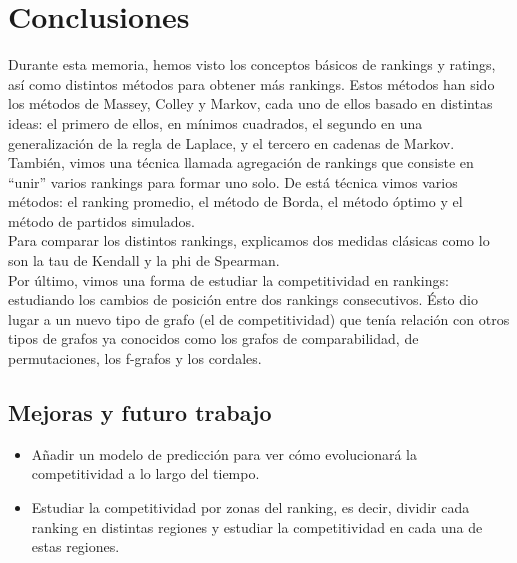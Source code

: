 \chapter{Conclusiones}

Durante esta memoria, hemos visto los conceptos básicos de rankings y ratings, así como distintos métodos para obtener más rankings. Estos métodos han sido los métodos de Massey, Colley y Markov, cada uno de ellos basado en distintas ideas: el primero de ellos, en mínimos cuadrados, el segundo en una generalización de la regla de Laplace, y el tercero en cadenas de Markov.\\

También, vimos una técnica llamada agregación de rankings que consiste en ``unir'' varios rankings para formar uno solo. De está técnica vimos varios métodos: el ranking promedio, el método de Borda, el método óptimo y el método de partidos simulados.\\

Para comparar los distintos rankings, explicamos dos medidas clásicas como lo son la tau de Kendall y la phi de Spearman.\\

Por último, vimos una forma de estudiar la competitividad en rankings: estudiando los cambios de posición entre dos rankings consecutivos. Ésto dio lugar a un nuevo tipo de grafo (el de competitividad) que tenía relación con otros tipos de grafos ya conocidos como los grafos de comparabilidad, de permutaciones, los f-grafos y los cordales.

\section{Mejoras y futuro trabajo}

\begin{itemize}

\item Añadir un modelo de predicción para ver cómo evolucionará la competitividad a lo largo del tiempo.

\item Estudiar la competitividad por zonas del ranking, es decir, dividir cada ranking en distintas regiones y estudiar la competitividad en cada una de estas regiones. 
\end{itemize}
